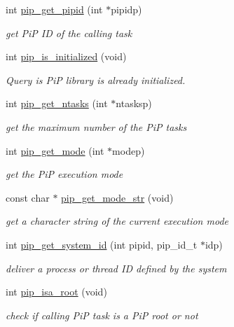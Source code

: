 \documentclass[twoside]{book}
\begin{document}
\begin{DoxyCompactItemize}
\item 
int \hyperlink{group__pip-5-misc_ga4e715bb8c325e9acc81af0745908dc0e}{pip\-\_\-get\-\_\-pipid} (int $\ast$pipidp)
\begin{DoxyCompactList}\small\item\em get Pi\-P I\-D of the calling task \end{DoxyCompactList}\item 
int \hyperlink{group__pip-5-misc_gabbec4ae2f820b13400f63cba55a53399}{pip\-\_\-is\-\_\-initialized} (void)
\begin{DoxyCompactList}\small\item\em Query is Pi\-P library is already initialized. \end{DoxyCompactList}\item 
int \hyperlink{group__pip-5-misc_ga9786d5aafa2a3882714c35ecc9f39a5a}{pip\-\_\-get\-\_\-ntasks} (int $\ast$ntasksp)
\begin{DoxyCompactList}\small\item\em get the maximum number of the Pi\-P tasks \end{DoxyCompactList}\item 
int \hyperlink{group__pip-5-misc_gab603f68c1ce972a5f3bfb8c95fcfb555}{pip\-\_\-get\-\_\-mode} (int $\ast$modep)
\begin{DoxyCompactList}\small\item\em get the Pi\-P execution mode \end{DoxyCompactList}\item 
const char $\ast$ \hyperlink{group__pip-5-misc_ga0e12c95fe7abc5c356acfd45a89ad5d8}{pip\-\_\-get\-\_\-mode\-\_\-str} (void)
\begin{DoxyCompactList}\small\item\em get a character string of the current execution mode \end{DoxyCompactList}\item 
int \hyperlink{group__pip-5-misc_gadf3d9e96b46d7a58bf4ce6dda173091a}{pip\-\_\-get\-\_\-system\-\_\-id} (int pipid, pip\-\_\-id\-\_\-t $\ast$idp)
\begin{DoxyCompactList}\small\item\em deliver a process or thread I\-D defined by the system \end{DoxyCompactList}\item 
int \hyperlink{group__pip-5-misc_ga6f1045bdbf682cb2ac504f09b57b73e9}{pip\-\_\-isa\-\_\-root} (void)
\begin{DoxyCompactList}\small\item\em check if calling Pi\-P task is a Pi\-P root or not \end{DoxyCompactList}\item 

\end{DoxyCompactItemize}
\end{document}
